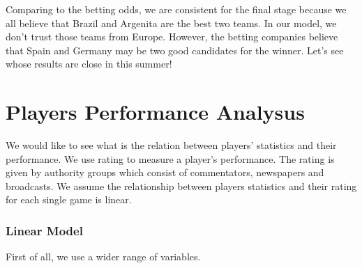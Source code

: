 \documentclass[letterpaper,10pt,english]{/usr/local/lib/python2.7/dist-packages/sphinx/texinputs/sphinxhowto}
\begin{document}
        
    
Comparing to the betting odds, we are consistent for the final stage
because we all believe that Brazil and Argenita are the best two teams.
In our model, we don't trust those teams from Europe. However, the
betting companies believe that Spain and Germany may be two good
candidates for the winner. Let's see whose results are close in this
summer!\part{Players Performance Analysus}We would like to see what is the relation between players' statistics
and their performance. We use rating to measure a player's performance.
The rating is given by authority groups which consist of commentators,
newspapers and broadcasts. We assume the relationship between players
statistics and their rating for each single game is linear.\section{Linear Model}First of all, we use a wider range of variables.

\end{document}
